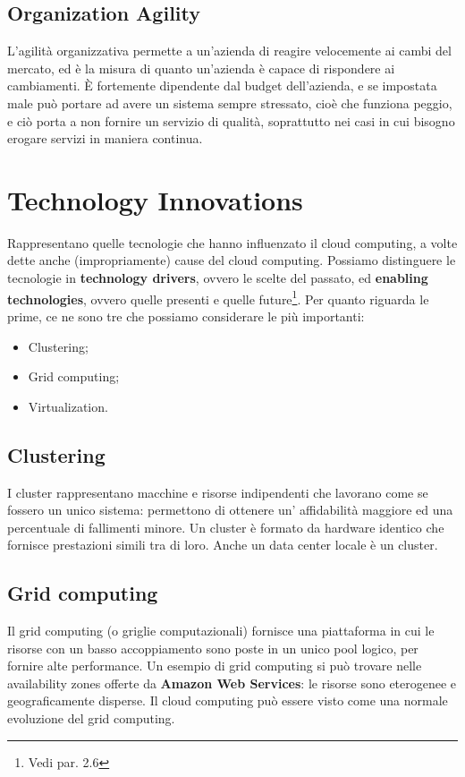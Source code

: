 \subsection{Organization Agility}
L'agilità organizzativa permette a un'azienda di reagire velocemente ai cambi del mercato, ed è la misura di quanto un'azienda è capace di rispondere ai cambiamenti. È fortemente dipendente dal budget dell'azienda, e se impostata male può portare ad avere un sistema sempre stressato, cioè che funziona peggio, e ciò porta a non fornire un servizio di qualità, soprattutto nei casi in cui bisogno erogare servizi in maniera continua.

\section{Technology Innovations}
Rappresentano quelle tecnologie che hanno influenzato il cloud computing, a volte dette anche (impropriamente) cause del cloud computing. Possiamo distinguere le tecnologie in \textbf{technology drivers}, ovvero le scelte del passato, ed \textbf{enabling technologies}, ovvero quelle presenti e quelle future\footnote{Vedi par. 2.6}.
Per quanto riguarda le prime, ce ne sono tre che possiamo considerare le più importanti:
\begin{itemize}
    \item Clustering;
    \item Grid computing;
    \item Virtualization.
\end{itemize}

\subsection{Clustering}
I cluster rappresentano macchine e risorse indipendenti che lavorano come se fossero un unico sistema: permettono di ottenere un' affidabilità maggiore ed una percentuale di fallimenti minore. Un cluster è formato da hardware identico che fornisce prestazioni simili tra di loro. Anche un data center locale è un cluster.

\subsection{Grid computing}
Il grid computing (o griglie computazionali) fornisce una piattaforma in cui le risorse con un basso accoppiamento sono poste in un unico pool logico, per fornire alte performance.
Un esempio di grid computing si può trovare nelle availability zones offerte da \textbf{Amazon Web Services}: le risorse sono eterogenee e geograficamente disperse. Il cloud computing può essere visto come una normale evoluzione del grid computing.
